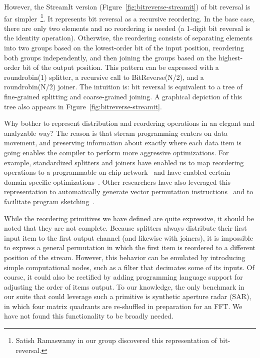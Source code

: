 However, the StreamIt version (Figure~\ref{fig:bitreverse-streamit})
of bit reversal is far simpler~\footnote{Satish Ramaswamy in our group
  discovered this representation of bit-reversal.}.  It represents bit
reversal as a recursive reordering.  In the base case, there are only
two elements and no reordering is needed (a 1-digit bit reversal is
the identity operation).  Otherwise, the reordering consists of
separating elements into two groups based on the lowest-order bit of
the input position, reordering both groups independently, and then
joining the groups based on the highest-order bit of the output
position.  This pattern can be expressed with a roundrobin(1)
splitter, a recursive call to BitReverse(N/2), and a roundrobin(N/2)
joiner.  The intuition is: bit reversal is equivalent to a tree of
fine-grained splitting and coarse-grained joining.  A graphical
depiction of this tree also appears in
Figure~\ref{fig:bitreverse-streamit}.

Why bother to represent distribution and reordering operations in an
elegant and analyzable way?  The reason is that stream programming
centers on data movement, and preserving information about exactly
where each data item is going enables the compiler to perform more
aggressive optimizations.  For example, standardized splitters and
joiners have enabled us to map reordering operations to a programmable
on-chip network~\cite{streamit-asplos} and have enabled certain
domain-specific
optimizations~\cite{lamb-pldi03,agrawal-cases05,techreport}.
Other researchers have also leveraged this representation to
automatically generate vector permutation
instructions~\cite{mani-permutations} and to facilitate program
sketching~\cite{bit-streaming}.

While the reordering primitives we have defined are quite expressive,
it should be noted that they are not complete.  Because splitters
always distribute their first input item to the first output channel
(and likewise with joiners), it is impossible to express a general
permutation in which the first item is reordered to a different
position of the stream.  However, this behavior can be emulated by
introducing simple computational nodes, such as a filter that
decimates some of its inputs.  Of course, it could also be rectified
by adding programming language support for adjusting the order of
items output.  To our knowledge, the only benchmark in our suite that
could leverage such a primitive is synthetic aperture radar (SAR), in
which four matrix quadrants are re-shuffled in preparation for an FFT.
We have not found this functionality to be broadly needed.

